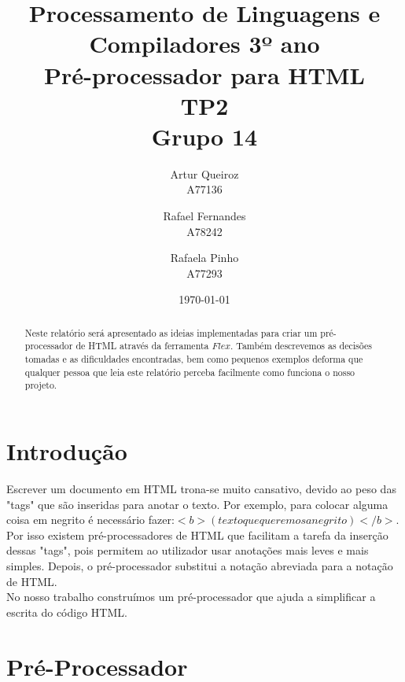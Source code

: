 \documentclass{report}
\title{Processamento de Linguagens e Compiladores 3º ano\\ \textbf{Pré-processador para HTML}\\ TP2\\ Grupo 14}
\author{Artur Queiroz\\ A77136 \and  Rafael Fernandes\\ A78242 \and Rafaela Pinho\\ A77293 }
\date{\today}
\begin{document}
\maketitle

\begin{abstract}
Neste relatório será apresentado as ideias implementadas para criar um pré-processador de HTML através da ferramenta $Flex$. 
Também descrevemos as decisões tomadas e as dificuldades encontradas, bem como pequenos exemplos deforma que qualquer pessoa que leia este relatório perceba facilmente como funciona o nosso projeto.
\end{abstract}

\tableofcontents

\chapter{Introdução} \label{intro}
Escrever um documento em HTML trona-se muito cansativo, devido ao peso das "tags" que são inseridas para anotar o texto. Por exemplo, para colocar alguma coisa em negrito é necessário fazer:$ <b>(texto que queremos a negrito)</b>$. \\ 

Por isso existem pré-processadores de HTML que facilitam a tarefa da inserção dessas "tags", pois permitem ao utilizador usar anotações mais leves e mais simples. Depois, o pré-processador substitui a notação abreviada para a notação de HTML.\\ 

No nosso trabalho construímos um pré-processador que ajuda a simplificar a escrita do código HTML. 


\chapter{Pré-Processador} \label{fi}
\end{document}
